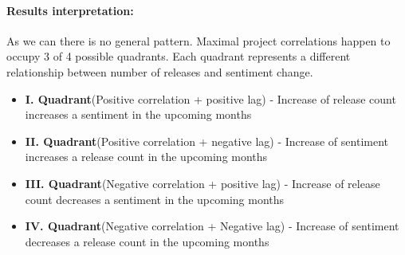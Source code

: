 \paragraph{Results interpretation:}

As we can there is no general pattern. Maximal project correlations happen to occupy 3 of 4 possible quadrants. Each quadrant represents a different relationship between number of releases and sentiment change.

\begin{itemize}
  \item \textbf{I. Quadrant}(Positive correlation + positive lag) - Increase of release count increases a sentiment in the upcoming months
  \item \textbf{II. Quadrant}(Positive correlation + negative lag) - Increase of sentiment increases a release count in the upcoming months
  \item \textbf{III. Quadrant}(Negative correlation + positive lag) - Increase of release count decreases a sentiment in the upcoming months
  \item \textbf{IV. Quadrant}(Negative correlation + Negative lag) - Increase of sentiment decreases a release count in the upcoming months
\end{itemize}
